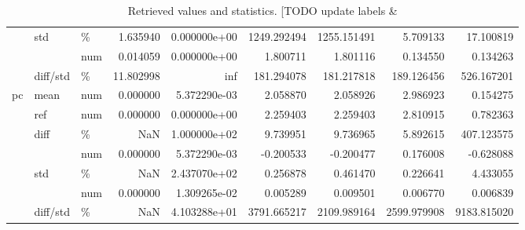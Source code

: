 \begin{table}
\begin{tabular}{lllrrrrrr}
   & std & \% &           1.635940 &       0.000000e+00 &        1249.292494 &        1255.151491 &          5.709133 &         17.100819 \\
   &          & num &           0.014059 &       0.000000e+00 &           1.800711 &           1.801116 &          0.134550 &          0.134263 \\
   & diff/std & \% &          11.802998 &                inf &         181.294078 &         181.217818 &        189.126456 &        526.167201 \\
pc & mean & num &           0.000000 &       5.372290e-03 &           2.058870 &           2.058926 &          2.986923 &          0.154275 \\
   & ref & num &           0.000000 &       0.000000e+00 &           2.259403 &           2.259403 &          2.810915 &          0.782363 \\
   & diff & \% &                NaN &       1.000000e+02 &           9.739951 &           9.736965 &          5.892615 &        407.123575 \\
   &          & num &           0.000000 &       5.372290e-03 &          -0.200533 &          -0.200477 &          0.176008 &         -0.628088 \\
   & std & \% &                NaN &       2.437070e+02 &           0.256878 &           0.461470 &          0.226641 &          4.433055 \\
   &          & num &           0.000000 &       1.309265e-02 &           0.005289 &           0.009501 &          0.006770 &          0.006839 \\
   & diff/std & \% &                NaN &       4.103288e+01 &        3791.665217 &        2109.989164 &       2599.979908 &       9183.815020 \\
\bottomrule
\end{tabular}

\caption{\label{tab:matE}Retrieved values and statistics. [TODO update labels &}
\end{table}